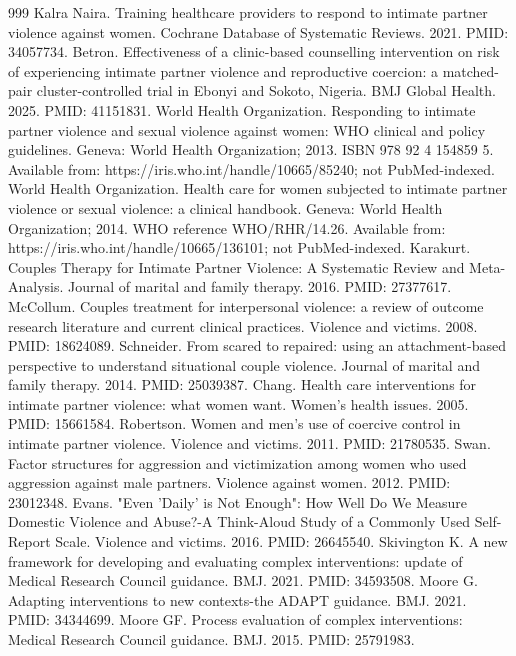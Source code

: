 \documentclass[11pt]{article}
\begin{document}
\begin{thebibliography}{999}
 Kalra Naira. Training healthcare providers to respond to intimate partner violence against women. Cochrane Database of Systematic Reviews. 2021. PMID: 34057734.
 Betron. Effectiveness of a clinic-based counselling intervention on risk of experiencing intimate partner violence and reproductive coercion: a matched-pair cluster-controlled trial in Ebonyi and Sokoto, Nigeria. BMJ Global Health. 2025. PMID: 41151831.
 World Health Organization. Responding to intimate partner violence and sexual violence against women: WHO clinical and policy guidelines. Geneva: World Health Organization; 2013. ISBN 978 92 4 154859 5. Available from: https://iris.who.int/handle/10665/85240; not PubMed-indexed.
 World Health Organization. Health care for women subjected to intimate partner violence or sexual violence: a clinical handbook. Geneva: World Health Organization; 2014. WHO reference WHO/RHR/14.26. Available from: https://iris.who.int/handle/10665/136101; not PubMed-indexed.
 Karakurt. Couples Therapy for Intimate Partner Violence: A Systematic Review and Meta-Analysis. Journal of marital and family therapy. 2016. PMID: 27377617.
 McCollum. Couples treatment for interpersonal violence: a review of outcome research literature and current clinical practices. Violence and victims. 2008. PMID: 18624089.
 Schneider. From scared to repaired: using an attachment-based perspective to understand situational couple violence. Journal of marital and family therapy. 2014. PMID: 25039387.
 Chang. Health care interventions for intimate partner violence: what women want. Women's health issues. 2005. PMID: 15661584.
 Robertson. Women and men's use of coercive control in intimate partner violence. Violence and victims. 2011. PMID: 21780535.
 Swan. Factor structures for aggression and victimization among women who used aggression against male partners. Violence against women. 2012. PMID: 23012348.
 Evans. "Even 'Daily' is Not Enough": How Well Do We Measure Domestic Violence and Abuse?-A Think-Aloud Study of a Commonly Used Self-Report Scale. Violence and victims. 2016. PMID: 26645540.
 Skivington K. A new framework for developing and evaluating complex interventions: update of Medical Research Council guidance. BMJ. 2021. PMID: 34593508.
 Moore G. Adapting interventions to new contexts-the ADAPT guidance. BMJ. 2021. PMID: 34344699.
 Moore GF. Process evaluation of complex interventions: Medical Research Council guidance. BMJ. 2015. PMID: 25791983.

\end{thebibliography}
\end{document}
